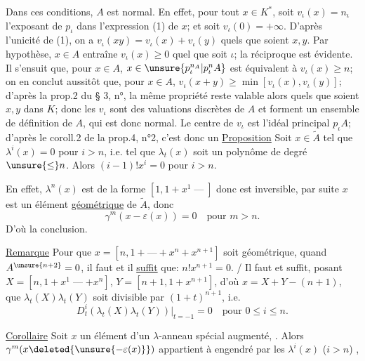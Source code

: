 Dans ces conditions, $A$ est normal. En effet, pour tout $x\in K^*$, soit $v_\iota(x)=n_\iota$ l'exposant de $p_\iota$ dans l'expression (1) de $x$; et soit $v_\iota(0)=+\infty$. D'après l'unicité de (1), on a $v_\iota(xy)=v_\iota(x)+v_\iota(y)$ quels que soient $x,y$. Par hypothèse, $x\in A$ entraîne $v_\iota(x)\geq0$ quel que soit $\iota$; la réciproque est évidente. Il s'ensuit que, pour $x\in A$, $x\in\unsure{p_\iota^{n_A}|p_\iota^n A}$ est équivalent à $v_\iota(x)\geq n$; on en conclut aussitôt que, pour $x\in A$, $v_\iota(x+y)\geq\min[v_\iota(x),v_\iota(y)]$; d'après la prop.2 du § 3, n°, la même propriété reste valable alors quels que soient $x,y$ dans $K$; donc les $v_\iota$ sont des valuations discrètes de $A$ et forment un ensemble de définition de $A$, qui est donc normal. Le centre de $v_\iota$ est l'idéal principal $p_\iota A$; d'après le coroll.2 de la prop.4, n°2, c'est donc un
\margin{$\big|$}
\uline{Proposition} Soit $x\in\widetilde A$ tel que  $\lambda^i(x)=0$ pour $i>n$, i.e. tel que $\lambda_t(x)$ soit un polynôme de degré $\unsure{\leq}n$. Alors  $(i-1)!x^i=0$ pour $i>n$.

En effet, $\lambda^n(x)$ est de la forme $[1,1+x^1\mathbin{\text{---}}]$ donc est inversible, par suite $x$ est un élément \uline{géométrique}  de $\widetilde A$, donc
\[
\gamma^m(x-\varepsilon(x))=0\quad\text{pour }m>n.
\]
D'où la conclusion.

\uline{Remarque} Pour que $x=[n,1+\text{---}+x^n+x^{n+1}]$ soit géométrique, quand $A^{\unsure{n+2}}=0$, il faut et il \uline{suffit} que: $n!x^{n+1}=0$.
/ Il faut et suffit, posant $X=[n,1+x^1\mathbin{\text{---}}+x^n]$, $Y=[n+1,1+x^{n+1}]$, d'où $x=X+Y-(n+1)$, que $\lambda_t(X)\lambda_t(Y)$ soit divisible par $(1+t)^{n+1}$,
i.e.
\[
D_t^i(\lambda_t(X)\lambda_t(Y))\big|_{t=-1}=0\quad\text{pour }0\leq i\leq n.
\]

\margin{$\Big|$}
\uline{Corollaire} Soit $x$ un élément  d'un $\lambda$-anneau spécial augmenté, . Alors $\gamma^m(x\deleted{\unsure{-\varepsilon(x)}})$ appartient à  engendré par les $\lambda^i(x)$ ($i>n$) 
,

